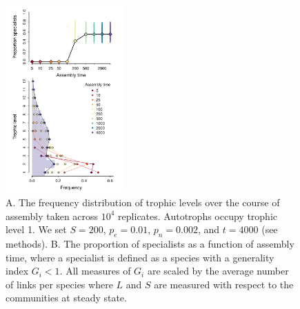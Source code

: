 \documentclass[9pt,twocolumn,twoside]{pnas-new}
\begin{document}
\begin{figure}
\centering
\includegraphics[width=0.4\textwidth]{fig_trophic.pdf}
\caption{
A. The frequency distribution of trophic levels over the course of assembly taken across $10^4$ replicates. Autotrophs occupy trophic level 1.
We set $S=200$, $p_e=0.01$, $p_n=0.002$, and $t=4000$ (see methods).
B. The proportion of specialists as a function of assembly time, where a specialist is defined as a species with a generality index $G_i < 1$.
All measures of $G_i$ are scaled by the average number of links per species where $L$ and $S$ are measured with respect to the communities at steady state.
}
\label{fig:trophic}
\end{figure}





\end{document}
